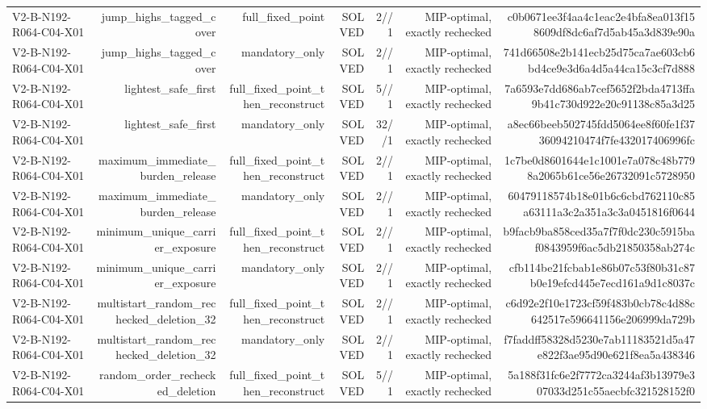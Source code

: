 {\begin{longtable}{lrrrrrr}
V2-B-N192-R064-C04-X01 & jump\_highs\_tagged\_cover & full\_fixed\_point & SOLVED & 2//1 & MIP-optimal, exactly rechecked & c0b0671ee3f4aa4c1eac2e4bfa8ea013f158609df8dc6af7d5ab45a3d839e90a \\
V2-B-N192-R064-C04-X01 & jump\_highs\_tagged\_cover & mandatory\_only & SOLVED & 2//1 & MIP-optimal, exactly rechecked & 741d66508e2b141ecb25d75ca7ae603cb6bd4ce9e3d6a4d5a44ca15c3cf7d888 \\
V2-B-N192-R064-C04-X01 & lightest\_safe\_first & full\_fixed\_point\_then\_reconstruct & SOLVED & 5//1 & MIP-optimal, exactly rechecked & 7a6593e7dd686ab7cef5652f2bda4713ffa9b41c730d922e20c91138c85a3d25 \\
V2-B-N192-R064-C04-X01 & lightest\_safe\_first & mandatory\_only & SOLVED & 32//1 & MIP-optimal, exactly rechecked & a8ec66beeb502745fdd5064ee8f60fe1f3736094210474f7fe432017406996fc \\
V2-B-N192-R064-C04-X01 & maximum\_immediate\_burden\_release & full\_fixed\_point\_then\_reconstruct & SOLVED & 2//1 & MIP-optimal, exactly rechecked & 1c7be0d8601644e1c1001e7a078c48b7798a2065b61ce56e26732091c5728950 \\
V2-B-N192-R064-C04-X01 & maximum\_immediate\_burden\_release & mandatory\_only & SOLVED & 2//1 & MIP-optimal, exactly rechecked & 60479118574b18e01b6c6cbd762110c85a63111a3c2a351a3c3a0451816f0644 \\
V2-B-N192-R064-C04-X01 & minimum\_unique\_carrier\_exposure & full\_fixed\_point\_then\_reconstruct & SOLVED & 2//1 & MIP-optimal, exactly rechecked & b9facb9ba858ced35a7f7f0dc230c5915baf0843959f6ac5db21850358ab274c \\
V2-B-N192-R064-C04-X01 & minimum\_unique\_carrier\_exposure & mandatory\_only & SOLVED & 2//1 & MIP-optimal, exactly rechecked & cfb114be21fcbab1e86b07c53f80b31c87b0e19efcd445e7ecd161a9d1c8037c \\
V2-B-N192-R064-C04-X01 & multistart\_random\_rechecked\_deletion\_32 & full\_fixed\_point\_then\_reconstruct & SOLVED & 2//1 & MIP-optimal, exactly rechecked & c6d92e2f10e1723cf59f483b0cb78c4d88c642517e596641156e206999da729b \\
V2-B-N192-R064-C04-X01 & multistart\_random\_rechecked\_deletion\_32 & mandatory\_only & SOLVED & 2//1 & MIP-optimal, exactly rechecked & f7faddff58328d5230e7ab11183521d5a47e822f3ae95d90e621f8ea5a438346 \\
V2-B-N192-R064-C04-X01 & random\_order\_rechecked\_deletion & full\_fixed\_point\_then\_reconstruct & SOLVED & 5//1 & MIP-optimal, exactly rechecked & 5a188f31fc6e2f7772ca3244af3b13979e307033d251c55aecbfc321528152f0 \\

\end{longtable}}
